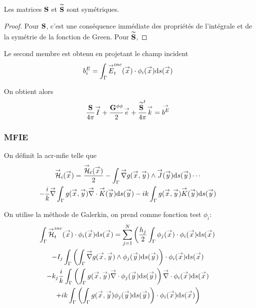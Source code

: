       \begin{prop}
        Les matrices \(\mS\) et \(\mSt\) sont symétriques.
      \end{prop}
      \begin{proof}
        Pour \(\mS\), c'est une conséquence immédiate des propriétés de l'intégrale et de la symétrie de la fonction de Green.
        Pour \(\mSt\), 
      \end{proof}

      Le second membre est obtenu en projetant le champ incident 
      \begin{equation}
        b_i^E = \int_\Gamma \vE^{inc}_t(\vx) \cdot \phi_i(\vx)\dd{s}(\vx)
      \end{equation}

      On obtient alors 
      \begin{equation}
        \frac{\mS}{4\pi}\vect{I}
        + \frac{\mG{\phi}{\phi}}{2}\vect{e}
        + \frac{\mSt^t}{4\pi}\vect{k}
        = \vect{b^E}
      \end{equation}
    
    \subsubsection{MFIE}
      On définit la \gls{acr-mfie} telle que
      \begin{multline}
        \label{eq:form_int:EFIE}
        \vH_i(\vx) = 
        \frac{\vH_t(\vx)}{2} 
          - \int_\Gamma \vgrad g(\vx,\vy) \pvect \vJ(\vy) \dd{s}(\vy) \cdots \\
        - \frac{i}{k} \vgrad \int_\Gamma  g(\vx,\vy)\vdiv\vK(\vy)\dd{s}(\vy) 
          - ik \int_\Gamma g(\vx,\vy)\vK(\vy)\dd{s}(\vy)
      \end{multline}
      
      On utilise la méthode de Galerkin, on prend comme fonction test \(\phi_i\): 
      \begin{multline}
        \int_\Gamma \vH^{inc}_t(\vx) \cdot \phi_i(\vx) \dd{s}(\vx) = \sum_{j=1}^{N} \left(
          \frac{h_j}{2}\int_\Gamma \phi_j(\vx) \cdot \phi_i(\vx) \dd{s}(\vx) \right. \\
          -  I_j\int_\Gamma  \left(\int_\Gamma \vgrad g(\vx,\vy) \pvect \phi_j(\vy) \dd{s}(\vy) \right) \cdot \phi_i(\vx) \dd{s}(\vx) \\
          - k_j\frac{i}{k} \int_\Gamma \left(\int_\Gamma g(\vx,\vy)\vdiv \phi_j(\vy) \dd{s}(\vy) \right) \vdiv \phi_i(\vx) \dd{s}(\vx) \\
        \left.
          + ik\int_\Gamma \left(\int_\Gamma g(\vx,\vy)\phi_j(\vy)\dd{s}{(\vy)}\right)\cdot \phi_i(\vx)\dd{s}(\vx)
        \right)
      \end{multline}

